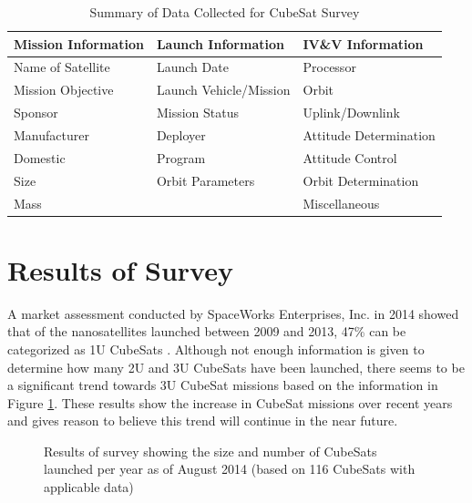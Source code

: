 \documentclass[11pt]{article}
\begin{document}
\begin{table}[h]
\centering
\caption{Summary of Data Collected for CubeSat Survey}
\label{summary}
\begin{tabular}{|l|l|l|}
\hline
\textbf{Mission Information} & \textbf{Launch Information} & \textbf{IV\&V Information} \\ \hline
Name of Satellite & Launch Date & Processor \\ \hline
Mission Objective & Launch Vehicle/Mission & Orbit \\ \hline
Sponsor & Mission Status & Uplink/Downlink \\ \hline
Manufacturer & Deployer & Attitude Determination \\ \hline
Domestic & Program & Attitude Control \\ \hline
Size & Orbit Parameters & Orbit Determination \\ \hline
Mass &  & Miscellaneous \\ \hline
\end{tabular}
\end{table}

\section{Results of Survey}
A market assessment conducted by SpaceWorks Enterprises, Inc. in 2014 showed that of the nanosatellites launched between 2009 and 2013, 47\% can be categorized as 1U CubeSats \cite{MarketAssessment}.  Although not enough information is given to determine how many 2U and 3U CubeSats have been launched, there seems to be a significant trend towards 3U CubeSat missions based on the information in Figure \ref{peryear}.  These results show the increase in CubeSat missions over recent years and gives reason to believe this trend will continue in the near future.

\begin{figure}[h]
\centering
{}
\caption{Results of survey showing the size and number of CubeSats launched per year as of August 2014 (based on 116 CubeSats with applicable data)}
\label{peryear}
\end{figure}
\end{document}
